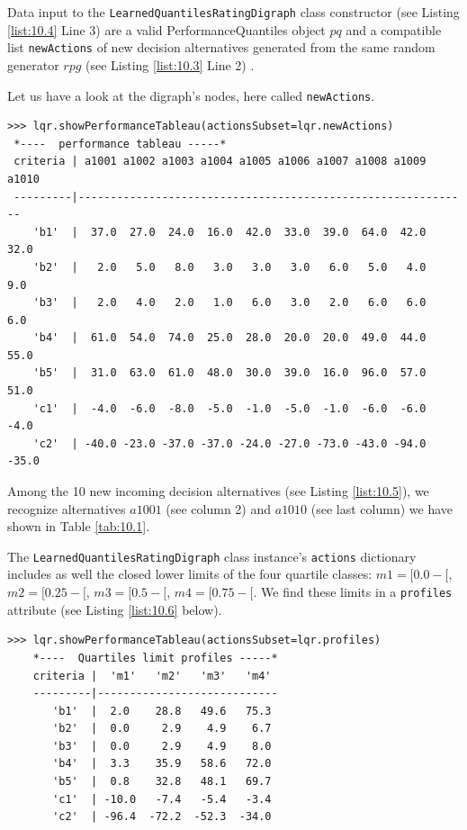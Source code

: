 Data input to the \texttt{LearnedQuantilesRatingDigraph} class constructor (see Listing \ref{list:10.4} Line 3) are a valid PerformanceQuantiles object $pq$ and a compatible list \texttt{newActions} of new decision alternatives generated from the same random generator $rpg$ (see Listing \ref{list:10.3} Line 2) .

Let us have a look at the digraph's nodes, here called \texttt{newActions}.
\begin{lstlisting}[caption={Performance tableau of the new incoming decision alternatives},label=list:10.5,basicstyle=\scriptsize]
>>> lqr.showPerformanceTableau(actionsSubset=lqr.newActions)
 *----  performance tableau -----*
 criteria | a1001 a1002 a1003 a1004 a1005 a1006 a1007 a1008 a1009 a1010   
 ---------|-------------------------------------------------------------
    'b1'  |  37.0  27.0  24.0  16.0  42.0  33.0  39.0  64.0  42.0  32.0  
    'b2'  |   2.0   5.0   8.0   3.0   3.0   3.0   6.0   5.0   4.0   9.0  
    'b3'  |   2.0   4.0   2.0   1.0   6.0   3.0   2.0   6.0   6.0   6.0  
    'b4'  |  61.0  54.0  74.0  25.0  28.0  20.0  20.0  49.0  44.0  55.0  
    'b5'  |  31.0  63.0  61.0  48.0  30.0  39.0  16.0  96.0  57.0  51.0  
    'c1'  |  -4.0  -6.0  -8.0  -5.0  -1.0  -5.0  -1.0  -6.0  -6.0  -4.0  
    'c2'  | -40.0 -23.0 -37.0 -37.0 -24.0 -27.0 -73.0 -43.0 -94.0 -35.0  
\end{lstlisting}
  
Among the 10 new incoming decision alternatives (see Listing \ref{list:10.5}), we recognize alternatives $a1001$ (see column 2) and $a1010$ (see last column) we have shown in Table \ref{tab:10.1}.

The \texttt{LearnedQuantilesRatingDigraph} class instance's \texttt{actions} dictionary includes as well the closed lower limits of the four quartile classes: $m1 = [0.0- [$, $m2 = [0.25- [$, $m3 = [0.5- [$, $m4 = [0.75 - [$. We find these limits in a \texttt{profiles} attribute (see Listing \ref{list:10.6} below).
\begin{lstlisting}[caption={Showing the limiting profiles of the rating quantiles},label=list:10.6]
>>> lqr.showPerformanceTableau(actionsSubset=lqr.profiles)
    *----  Quartiles limit profiles -----*
    criteria |  'm1'   'm2'   'm3'   'm4'   
    ---------|----------------------------
       'b1'  |  2.0    28.8   49.6   75.3  
       'b2'  |  0.0     2.9    4.9    6.7  
       'b3'  |  0.0     2.9    4.9    8.0  
       'b4'  |  3.3    35.9   58.6   72.0  
       'b5'  |  0.8    32.8   48.1   69.7  
       'c1'  | -10.0   -7.4   -5.4   -3.4  
       'c2'  | -96.4  -72.2  -52.3  -34.0  
\end{lstlisting}

